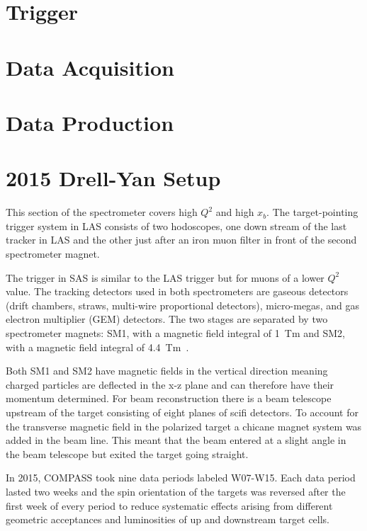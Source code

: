 \section{Trigger}

\section{Data Acquisition}

\section{Data Production}

\section{2015 Drell-Yan Setup}


This section of the spectrometer covers high
$Q^2$ and high $x_b$.  The target-pointing trigger system in LAS consists of two
hodoscopes, one down stream of the last tracker in LAS and the other just after
an iron muon filter in front of the second spectrometer magnet.

The trigger in SAS is
similar to the LAS trigger but for muons of a lower $Q^2$ value.  The tracking
detectors used in both spectrometers are gaseous detectors (drift chambers,
straws, multi-wire proportional detectors), micro-megas, and gas electron
multiplier (GEM) detectors.  The two stages are separated by two spectrometer
magnets: SM1, with a magnetic field integral of 1~Tm and SM2, with a magnetic
field integral of 4.4~Tm~\cite{compassSpec}.

Both SM1 and SM2 have magnetic
fields in the vertical direction meaning charged particles are deflected in the
x-z plane and can therefore have their momentum determined.  For beam
reconstruction there is a beam telescope upstream of the target consisting of
eight planes of scifi detectors.  To account for the transverse magnetic field
in the polarized target a chicane magnet system was added in the beam line.
This meant that the beam entered at a slight angle in the beam telescope but
exited the target going straight. \par

In 2015, COMPASS took nine data periods labeled W07-W15.  Each data period
lasted two weeks and the spin orientation of the targets was reversed after the
first week of every period to reduce systematic effects arising from different
geometric acceptances and luminosities of up and downstream target cells.

